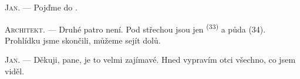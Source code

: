 \textsc{Jan}. --- Pojďme do .

\textsc{Architekt}. --- Druhé patro není. Pod střechou jsou jen 
\textsuperscript{(33)} a půda (34). Prohlídku jsme skončili, můžeme sejít dolů.

\textsc{Jan}. --- Děkuji, pane, je to velmi zajímavé. Hned vypravím otci všechno, co jsem
viděl.
